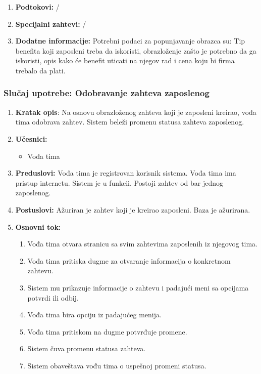 \documentclass[a4paper]{article}
\begin{document}
\begin{enumerate}
\begin{enumerate}
        \end{enumerate}
    \item \textbf{Podtokovi:} /
    \item \textbf{Specijalni zahtevi:} /
    \item \textbf{Dodatne informacije:} Potrebni podaci za popunjavanje obrazca su: Tip benefita koji zaposleni treba da iskoristi, obrazloženje zašto je potrebno da ga iskoristi, opis kako će benefit uticati na njegov rad i cena koju bi firma trebalo da plati.
\end{enumerate}

\subsubsection{Slučaj upotrebe: Odobravanje zahteva zaposlenog}
\begin{enumerate}
    \item \textbf{Kratak opis}: Na osnovu obrazloženog zahteva koji je zaposleni kreirao, vođa tima odobrava zahtev. Sistem beleži promenu statusa zahteva zaposlenog.
    \item \textbf{Učesnici:}
        \begin{itemize}
            \item Vođa tima
        \end{itemize}
    \item \textbf{Preduslovi:} Vođa tima je registrovan korisnik sistema. Vođa tima ima pristup internetu. Sistem je u funkcii. Postoji zahtev od bar jednog zaposlenog.
    \item \textbf{Postuslovi:} Ažuriran je zahtev koji je kreirao zaposleni. Baza je ažurirana.
    \item \textbf{Osnovni tok:}
        \begin{enumerate}
            \item Vođa tima otvara stranicu sa svim zahtevima zaposlenih iz njegovog tima.
            \item Vođa tima pritiska dugme za otvaranje informacija o konkretnom zahtevu.
            \item Sistem mu prikazuje informacije o zahtevu i padajući meni sa opcijama potvrdi ili odbij.
            \item Vođa tima bira opciju iz padajućeg menija.
            \item Vođa tima pritiskom na dugme potvrđuje promene.
            \item Sistem čuva promenu statusa zahteva.
            \item Sistem obaveštava vođu tima o uspešnoj promeni statusa.

\end{enumerate}
\end{enumerate}
\end{document}
